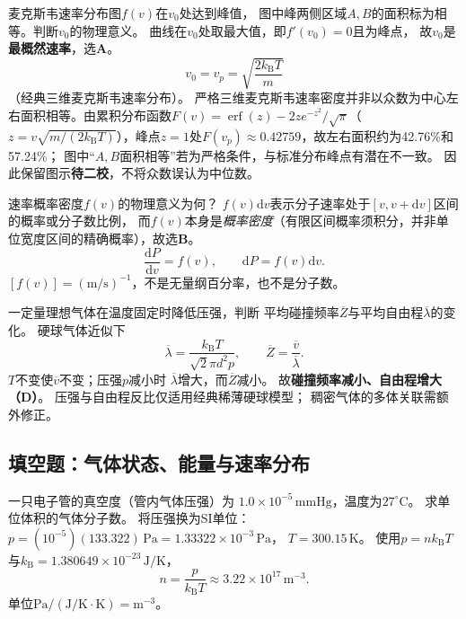\problemtext 麦克斯韦速率分布图$f(v)$在$v_0$处达到峰值，
图中峰两侧区域$A,B$的面积标为相等。判断$v_0$的物理意义。
\workings
曲线在$v_0$处取最大值，即$f'(v_0)=0$且为峰点，
故$v_0$是\textbf{最概然速率}，选\textbf{A}。
\[
\boxed{v_0=v_p=\sqrt{\frac{2k_{\mathrm B}T}{m}}}
\]
（经典三维麦克斯韦速率分布）。
\crosscheck 严格三维麦克斯韦速率密度并非以众数为中心左右面积相等。由累积分布函数$F(v)=\operatorname{erf}(z)-2ze^{-z^2}/\sqrt\pi$（$z=v\sqrt{m/(2k_{\mathrm B}T)}$），峰点$z=1$处$F(v_p)\approx0.42759$，故左右面积约为42.76\%和57.24\%；
图中“$A,B$面积相等”若为严格条件，与标准分布峰点有潜在不一致。
因此保留图示\textbf{待二校}，不将众数误认为中位数。

\problemtext 速率概率密度$f(v)$的物理意义为何？
\workings
$f(v)\mathrm dv$表示分子速率处于$[v,v+\mathrm dv]$区间的概率或分子数比例，
而$f(v)$本身是\emph{概率密度}（有限区间概率须积分，并非单位宽度区间的精确概率），故选\textbf{B}。
\[
\boxed{\frac{\mathrm dP}{\mathrm dv}=f(v),\qquad
\mathrm dP=f(v)\mathrm dv}.
\]
\crosscheck $[f(v)]=(\mathrm{m/s})^{-1}$，不是无量纲百分率，也不是分子数。

\problemtext 一定量理想气体在温度固定时降低压强，判断
平均碰撞频率$\overline Z$与平均自由程$\overline\lambda$的变化。
\workings
硬球气体近似下
\[
\overline\lambda=\frac{k_{\mathrm B}T}
 {\sqrt2\pi d^2p},\qquad
\overline Z=\frac{\overline v}{\overline\lambda}.
\]
$T$不变使$\overline v$不变；压强$p$减小时
$\overline\lambda$增大，而$\overline Z$减小。
故\textbf{碰撞频率减小、自由程增大（D）}。
\crosscheck 压强与自由程反比仅适用经典稀薄硬球模型；
稠密气体的多体关联需额外修正。

\subsection{填空题：气体状态、能量与速率分布}

\problemtext 一只电子管的真空度（管内气体压强）为
$1.0\times10^{-5}\,\mathrm{mmHg}$，温度为$27^\circ\mathrm C$。
求单位体积的气体分子数。
\workings
将压强换为SI单位：
$p=(10^{-5})(133.322)\,\mathrm{Pa}=1.33322\times10^{-3}\,\mathrm{Pa}$，
$T=300.15\,\mathrm K$。
使用$p=nk_{\mathrm B}T$与$k_{\mathrm B}=1.380649\times10^{-23}\,\mathrm{J/K}$，
\[
\boxed{n=\frac p{k_{\mathrm B}T}
\approx3.22\times10^{17}\,\mathrm{m^{-3}}}.
\]
\crosscheck 单位$\mathrm{Pa}/(\mathrm{J/K}\cdot\mathrm K)=\mathrm{m^{-3}}$。

